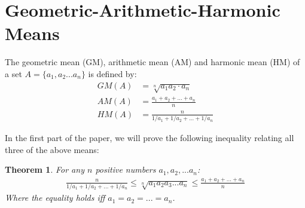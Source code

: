 \documentclass[12pt]{extreport}
\newtheorem*{thm}{Theorem}
\begin{document}
\section*{Geometric-Arithmetic-Harmonic Means}
The geometric mean (GM), arithmetic mean (AM) and harmonic mean (HM) of a set $A = \{a_1, a_2 ... a_n\}$ is defined by:
\begin{align*}
 GM(A) &= \sqrt[n]{a_1a_2 \cdot a_n} \\
 AM(A) &= \frac{a_1 + a_2 + ... + a_n}{n} \\
 HM(A) &= \frac{n}{1/a_1 + 1/a_2 + ... + 1/a_n}
\end{align*} 

In the first part of the paper, we will prove the following inequality relating all three of the above means:

\begin{thm}
For any $n$ positive numbers $a_1, a_2, ... a_n$: 
\begin{align*}
\frac{n}{1/a_1 + 1/a_2 + ... + 1/a_n} \leq \sqrt[n]{a_1 a_2 a_3 ... a_n} \leq \frac{a_1 + a_2 + ... + a_n}{n}
\end{align*}
Where the equality holds iff $a_1 = a_2 = ... = a_n$.
\end{thm}
\end{document}
